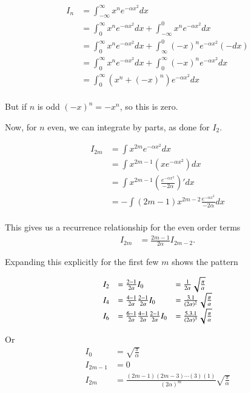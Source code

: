 \documentclass{article}
\begin{document}
\begin{align*}
I_n 
&= \int_{-\infty}^\infty x^n e^{-\alpha x^2} dx \\
&= \int_{0}^\infty x^n e^{-\alpha x^2} dx +\int_{-\infty}^0 x^n e^{-\alpha x^2} dx \\
&= \int_{0}^\infty x^n e^{-\alpha x^2} dx +\int_{\infty}^0 (-x)^n e^{-\alpha x^2} (-dx) \\
&= \int_{0}^\infty x^n e^{-\alpha x^2} dx +\int_0^{\infty} (-x)^n e^{-\alpha x^2} dx \\
&= \int_{0}^\infty (x^n + (-x)^n)e^{-\alpha x^2} dx \\
\end{align*}

But if $n$ is odd $(-x)^n = -x^n$, so this is zero.

Now, for $n$ even, we can integrate by parts, as done for $I_2$.

\begin{align*}
I_{2m}
&= \int x^{2m} e^{-\alpha x^2} dx \\
&= \int x^{2m-1} \left(x e^{-\alpha x^2}\right) dx \\
&= \int x^{2m-1} \left(\frac{e^{-\alpha x^2}}{-2\alpha}\right)' dx \\
&= -\int (2m-1) x^{2m-2} \frac{e^{-\alpha x^2}}{-2\alpha} dx \\
\end{align*}

This gives us a recurrence relationship for the even order terms
\begin{align}
I_{2m} &= \frac{2m-1}{2\alpha} I_{2m-2}.
\end{align}

Expanding this explicitly for the first few $m$ shows the pattern

\begin{align*}
\begin{array}{l l l}
I_2 &= \frac{2-1}{2\alpha} I_0 &= \frac{1}{2\alpha} \sqrt{\frac{\pi}{\alpha}} \\
I_4 &= \frac{4-1}{2\alpha}\frac{2-1}{2\alpha} I_0 &= \frac{3.1}{(2\alpha)^2} \sqrt{\frac{\pi}{\alpha}} \\
I_6 &= \frac{6-1}{2\alpha}\frac{4-1}{2\alpha}\frac{2-1}{2\alpha} I_0 &= \frac{5.3.1}{(2\alpha)^3} \sqrt{\frac{\pi}{\alpha}} \\
\end{array}
\end{align*}

Or
\begin{align}
I_{0} &= \sqrt{\frac{\pi}{\alpha}} \\
I_{2m-1} &= 0 \\
I_{2m} &= \frac{(2m-1)(2m-3)\cdots(3)(1)}{(2\alpha)^m} \sqrt{\frac{\pi}{\alpha}}
\end{align}



\end{document}

